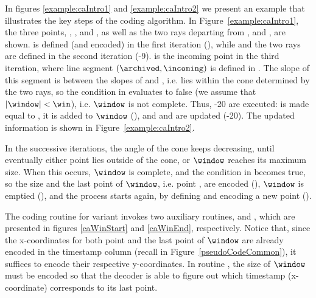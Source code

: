 In figures \ref{example:caIntro1} and \ref{example:caIntro2} we present an example that illustrates the key steps of the coding algorithm. In Figure~\ref{example:caIntro1}, the three points, \incoming, \archived, and \snapshot, as well as the two rays departing from \archived, \smin and \smax, are shown. \archived is defined (and encoded) in the first iteration (), while \snapshot and the two rays are defined in the second iteration (-9). \incoming is the incoming point in the third iteration, where line segment $(\archived, \incoming)$ is defined in . The slope of this segment is between the slopes of \smin and \smax, i.e. \incoming lies within the cone determined by the two rays, so the condition in  evaluates to false (we assume that $|\window|<\win$), i.e. $\window$ is not complete. Thus, -20 are executed: \snapshot is made equal to \incoming, it is added to $\window$ (), and \smin and \smax are updated (-20). The updated information is shown in Figure~\ref{example:caIntro2}. 


\vspace{+5pt}
\exampleCA


\vspace{+5pt}
In the successive iterations, the angle of the cone keeps decreasing, until eventually either point \incoming lies outside of the cone, or $\window$ reaches its maximum size. When this occurs, $\window$ is complete, and the condition in  becomes true, so the size and the last point of $\window$, i.e. point \snapshot, are encoded (), $\window$ is emptied (), and the process starts again, by defining and encoding a new point \archived ().


\vspace{+5pt}
The coding routine for variant \maskalgo invokes two auxiliary routines, \CAWinStart and \CAWinEnd, which are presented in figures \ref{caWinStart} and \ref{caWinEnd}, respectively. Notice that, since the x-coordinates for both point \archived and the last point of $\window$ are already encoded in the timestamp column (recall  in Figure~\ref{pseudoCodeCommon}), it suffices to encode their respective y-coordinates. In routine \CAWinEnd, the size of $\window$ must be encoded so that the decoder is able to figure out which timestamp (x-coordinate) corresponds to its last point.


\clearpage




